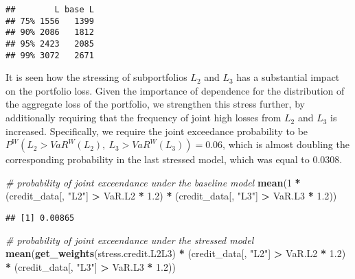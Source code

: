 \documentclass[
]{article}
\newenvironment{Shaded}{\begin{snugshade}}{\end{snugshade}}
\newcommand{\CommentTok}[1]{\textcolor[rgb]{0.56,0.35,0.01}{\textit{#1}}}
\newcommand{\DecValTok}[1]{\textcolor[rgb]{0.00,0.00,0.81}{#1}}
\newcommand{\FloatTok}[1]{\textcolor[rgb]{0.00,0.00,0.81}{#1}}
\newcommand{\KeywordTok}[1]{\textcolor[rgb]{0.13,0.29,0.53}{\textbf{#1}}}
\newcommand{\NormalTok}[1]{#1}
\newcommand{\OperatorTok}[1]{\textcolor[rgb]{0.81,0.36,0.00}{\textbf{#1}}}
\newcommand{\StringTok}[1]{\textcolor[rgb]{0.31,0.60,0.02}{#1}}
\begin{document}
\begin{verbatim}
##        L base L
## 75% 1556   1399
## 90% 2086   1812
## 95% 2423   2085
## 99% 3072   2671
\end{verbatim}

It is seen how the stressing of subportfolios \(L_2\) and \(L_3\) has a substantial impact on the portfolio loss. Given the importance of dependence for the distribution of the aggregate loss of the portfolio, we strengthen this stress further, by additionally requiring that the frequency of joint high losses from \(L_2\) and \(L_3\) is increased. Specifically, we require the joint exceedance probability to be \(P^W(L_2 > VaR^W(L_2),~ L_3 > VaR^W(L_3)) = 0.06\), which is almost doubling the corresponding probability in the last stressed model, which was equal to 0.0308.

\begin{Shaded}
\begin{Highlighting}[]
\CommentTok{\# probability of joint exceendance under the baseline model}
\KeywordTok{mean}\NormalTok{(}\DecValTok{1} \OperatorTok{*}\StringTok{ }\NormalTok{(credit\_data[, }\StringTok{"L2"}\NormalTok{] }\OperatorTok{\textgreater{}}\StringTok{ }\NormalTok{VaR.L2 }\OperatorTok{*}\StringTok{ }\FloatTok{1.2}\NormalTok{) }\OperatorTok{*}\StringTok{ }\NormalTok{(credit\_data[, }\StringTok{"L3"}\NormalTok{] }\OperatorTok{\textgreater{}}\StringTok{ }
\StringTok{    }\NormalTok{VaR.L3 }\OperatorTok{*}\StringTok{ }\FloatTok{1.2}\NormalTok{))}
\end{Highlighting}
\end{Shaded}

\begin{verbatim}
## [1] 0.00865
\end{verbatim}

\begin{Shaded}
\begin{Highlighting}[]
\CommentTok{\# probability of joint exceendance under the stressed model}
\KeywordTok{mean}\NormalTok{(}\KeywordTok{get\_weights}\NormalTok{(stress.credit.L2L3) }\OperatorTok{*}\StringTok{ }\NormalTok{(credit\_data[, }\StringTok{"L2"}\NormalTok{] }\OperatorTok{\textgreater{}}\StringTok{ }\NormalTok{VaR.L2 }\OperatorTok{*}\StringTok{ }
\StringTok{    }\FloatTok{1.2}\NormalTok{) }\OperatorTok{*}\StringTok{ }\NormalTok{(credit\_data[, }\StringTok{"L3"}\NormalTok{] }\OperatorTok{\textgreater{}}\StringTok{ }\NormalTok{VaR.L3 }\OperatorTok{*}\StringTok{ }\FloatTok{1.2}\NormalTok{))}
\end{Highlighting}
\end{Shaded}
\end{document}
